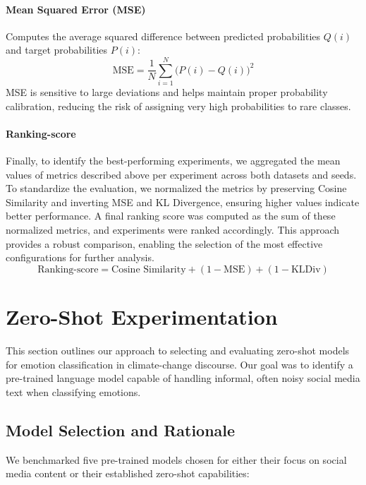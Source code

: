 \paragraph{Mean Squared Error (MSE)}  
Computes the average squared difference between predicted probabilities $Q(i)$ and target probabilities $P(i)$:
\begin{equation}
    \mathrm{MSE} = \frac{1}{N} \sum_{i=1}^{N} \bigl(P(i) - Q(i)\bigr)^2
\end{equation}
MSE is sensitive to large deviations and helps maintain proper probability calibration, reducing the risk of assigning very high probabilities to rare classes.

\paragraph{Ranking-score}
Finally, to identify the best-performing experiments, we aggregated the mean values of metrics described above per experiment across both datasets and seeds. To standardize the evaluation, we normalized the metrics by preserving Cosine Similarity and inverting MSE and KL Divergence, ensuring higher values indicate better performance. A final ranking score was computed as the sum of these normalized metrics, and experiments were ranked accordingly. This approach provides a robust comparison, enabling the selection of the most effective configurations for further analysis.
\begin{equation}
\text{Ranking-score} = \text{Cosine Similarity} + (1 - \text{MSE}) + (1 - \text{KLDiv})
\end{equation}


\section{Zero-Shot Experimentation}

This section outlines our approach to selecting and evaluating zero-shot models for emotion classification in climate-change discourse. Our goal was to identify a pre-trained language model capable of handling informal, often noisy social media text when classifying emotions.

\subsection{Model Selection and Rationale}

We benchmarked five pre-trained models chosen for either their focus on social media content or their established zero-shot capabilities:

